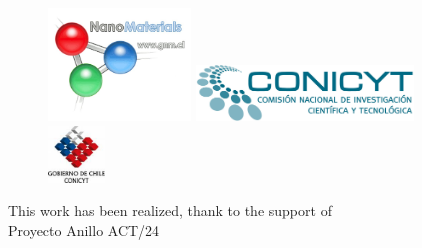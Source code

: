 \documentclass[a4paper,10pt]{scrbook}
\begin{document}
\vfill
\begin{center}
\begin{figure}[!hbt]\centering
\includegraphics[height=3cm]{gnm.jpg}\hskip2cm
\includegraphics[height=1.5cm]{conicyt.jpg}
\includegraphics[height=1.5cm]{gob-chile.jpeg}
\end{figure}
\end{center}
\begin{flushright}
 This work has been realized, thank to the support of\\
 Proyecto Anillo ACT/24
\end{flushright}



\newpage\pagestyle{empty}\tableofcontents\newpage
\pagestyle{fancy}
\newpage



\printindex
\end{document}
